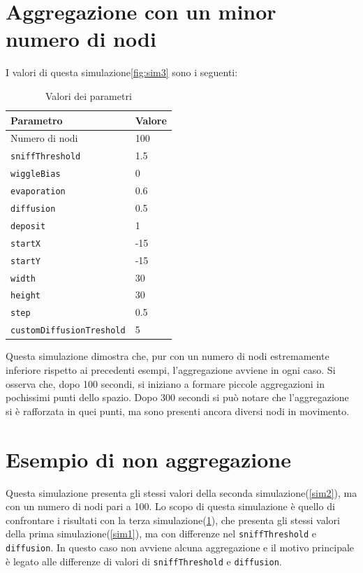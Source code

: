 \section{Aggregazione con un minor numero di nodi}\label{sim3}
I valori di questa simulazione\space \cref{fig:sim3} sono i seguenti:
\begin{table}[ht]
    \centering
    \caption{Valori dei parametri}
    \begin{tabular}{ll}
        \toprule
        Parametro                   & Valore \\
        \midrule
        Numero di nodi              & 100    \\
        \texttt{sniffThreshold}     & 1.5    \\
        \texttt{wiggleBias}         & 0      \\
        \texttt{evaporation}        & 0.6    \\
        \texttt{diffusion}          & 0.5    \\
        \texttt{deposit}            & 1      \\
        \texttt{startX}             & -15    \\
        \texttt{startY}             & -15    \\
        \texttt{width}              & 30     \\
        \texttt{height}             & 30     \\
        \texttt{step}               & 0.5    \\
        \texttt{customDiffusionTreshold} & 5 \\
        \bottomrule
    \end{tabular}\label{tab:parametri3}
\end{table}\newline
Questa simulazione dimostra che, pur con un numero di nodi estremamente inferiore rispetto ai precedenti esempi,
l'aggregazione avviene in ogni caso.
Si osserva che, dopo 100 secondi, si iniziano a formare piccole aggregazioni in pochissimi punti dello spazio.
Dopo 300 secondi si può notare che l'aggregazione si è rafforzata in quei punti, ma sono presenti ancora diversi nodi in movimento.


\section{Esempio di non aggregazione}\label{sim4}
Questa simulazione presenta gli stessi valori della seconda simulazione\space(\cref{sim2}), ma con un numero di nodi pari a 100.
Lo scopo di questa simulazione è quello di confrontare i risultati con la terza simulazione\space(\cref{sim3}), che presenta gli stessi valori della prima simulazione\space(\cref{sim1}),
ma con differenze nel \texttt{sniffThreshold} e \texttt{diffusion}. In questo caso non avviene alcuna aggregazione e 
il motivo principale è legato alle differenze di valori di \texttt{sniffThreshold} e \texttt{diffusion}.

